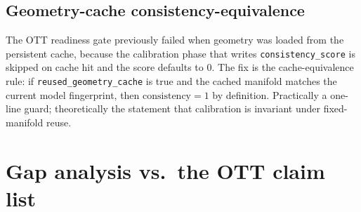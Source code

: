 \documentclass[11pt]{article}
\begin{document}
\subsection{Geometry-cache consistency-equivalence}

The OTT readiness gate previously failed when geometry was loaded from the
persistent cache, because the calibration phase that writes
\texttt{consistency\_score} is skipped on cache hit and the score defaults to
0. The fix is the cache-equivalence rule: if \texttt{reused\_geometry\_cache}
is true and the cached manifold matches the current model fingerprint, then
$\text{consistency}=1$ by definition. Practically a one-line guard;
theoretically the statement that calibration is invariant under fixed-manifold
reuse.

\section{Gap analysis vs.\ the OTT claim list}
\end{document}

